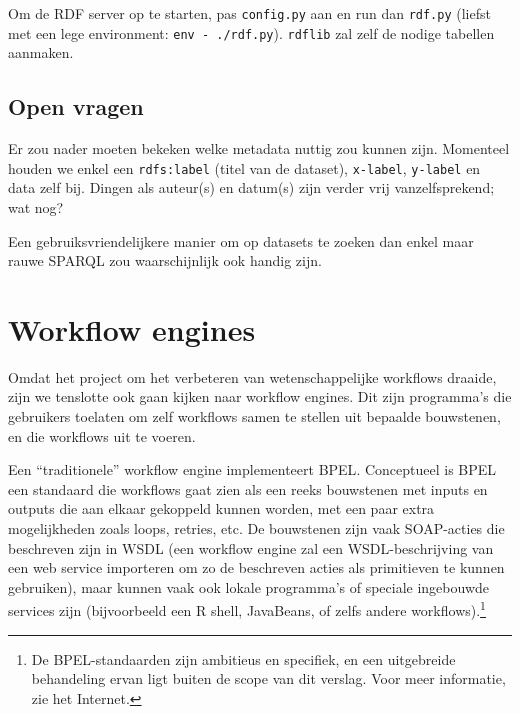 \documentclass[a4paper]{article}
\begin{document}
Om de \gls{RDF} server op te starten, pas {\tt config.py} aan en run dan
{\tt rdf.py} (liefst met een lege environment: {\tt env - ./rdf.py}).
{\tt rdflib} zal zelf de nodige tabellen aanmaken.

\subsection{Open vragen}

Er zou nader moeten bekeken welke metadata nuttig zou kunnen zijn. Momenteel
houden we enkel een {\tt rdfs:label} (titel van de dataset), {\tt x-label},
{\tt y-label} en data zelf bij. Dingen als auteur(s) en datum(s) zijn verder
vrij vanzelfsprekend; wat nog?

Een gebruiksvriendelijkere manier om op datasets te zoeken dan enkel maar rauwe
\gls{SPARQL} zou waarschijnlijk ook handig zijn.

\newpage

\section{Workflow engines}
\label{sec:workflow}

Omdat het project om het verbeteren van wetenschappelijke workflows draaide,
zijn we tenslotte ook gaan kijken naar workflow engines. Dit zijn programma's
die gebruikers toelaten om zelf workflows samen te stellen uit bepaalde
bouwstenen, en die workflows uit te voeren.

Een ``traditionele'' workflow engine implementeert \gls{BPEL}. Conceptueel is
\gls{BPEL} een standaard die workflows gaat zien als een reeks bouwstenen met
inputs en outputs die aan elkaar gekoppeld kunnen worden, met een paar extra
mogelijkheden zoals loops, retries, etc. De bouwstenen zijn vaak
\gls{SOAP}-acties die beschreven zijn in \gls{WSDL} (een workflow engine zal
een \gls{WSDL}-beschrijving van een web service importeren om zo de beschreven
acties als primitieven te kunnen gebruiken), maar kunnen vaak ook lokale
programma's of speciale ingebouwde services zijn (bijvoorbeeld een R shell,
JavaBeans, of zelfs andere workflows).\footnote{De \gls{BPEL}-standaarden zijn
ambitieus en specifiek, en een uitgebreide behandeling ervan ligt buiten de
scope van dit verslag. Voor meer informatie, zie het Internet.}
\end{document}
